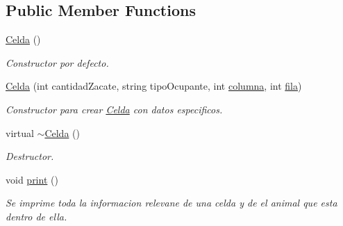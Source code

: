 \subsection*{Public Member Functions}
\begin{DoxyCompactItemize}
\item 
\hyperlink{classCelda_af1dadd95735043294599490d4abc6dc1}{Celda} ()
\begin{DoxyCompactList}\small\item\em Constructor por defecto. \end{DoxyCompactList}\item 
\hyperlink{classCelda_a03a6dc5cb3f51bc24efcc8d00e797d32}{Celda} (int cantidad\+Zacate, string tipo\+Ocupante, int \hyperlink{classCelda_a5f93fabd067087b5679e6226c7eb4313}{columna}, int \hyperlink{classCelda_a58bd35cc52cc550b75a33cdaccdd014b}{fila})
\begin{DoxyCompactList}\small\item\em Constructor para crear \hyperlink{classCelda}{Celda} con datos especificos. \end{DoxyCompactList}\item 
virtual \hyperlink{classCelda_a256de3b5c647bbbe404e4b40aca0d0f2}{$\sim$\+Celda} ()
\begin{DoxyCompactList}\small\item\em Destructor. \end{DoxyCompactList}\item 
void \hyperlink{classCelda_a915164163bf22fd3277d7791074d8bbe}{print} ()
\begin{DoxyCompactList}\small\item\em Se imprime toda la informacion relevane de una celda y de el animal que esta dentro de ella. \end{DoxyCompactList}\end{DoxyCompactItemize}
